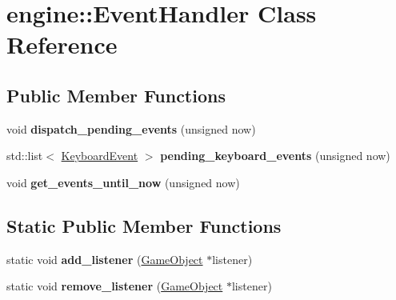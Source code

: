 \hypertarget{classengine_1_1_event_handler}{}\section{engine\+:\+:Event\+Handler Class Reference}
\label{classengine_1_1_event_handler}
\subsection*{Public Member Functions}
\begin{DoxyCompactItemize}
\item 
void {\bfseries dispatch\+\_\+pending\+\_\+events} (unsigned now)\hypertarget{classengine_1_1_event_handler_a7897cdaa9aa300a3d73790ab9245ff62}{}\label{classengine_1_1_event_handler_a7897cdaa9aa300a3d73790ab9245ff62}

\item 
std\+::list$<$ \hyperlink{classengine_1_1_keyboard_event}{Keyboard\+Event} $>$ {\bfseries pending\+\_\+keyboard\+\_\+events} (unsigned now)\hypertarget{classengine_1_1_event_handler_a615ce0d67badc44977c3f71ecb911243}{}\label{classengine_1_1_event_handler_a615ce0d67badc44977c3f71ecb911243}

\item 
void {\bfseries get\+\_\+events\+\_\+until\+\_\+now} (unsigned now)\hypertarget{classengine_1_1_event_handler_a6fc13e4f43fe29d3aafa1ed29018b6d2}{}\label{classengine_1_1_event_handler_a6fc13e4f43fe29d3aafa1ed29018b6d2}

\end{DoxyCompactItemize}
\subsection*{Static Public Member Functions}
\begin{DoxyCompactItemize}
\item 
static void {\bfseries add\+\_\+listener} (\hyperlink{classengine_1_1_game_object}{Game\+Object} $\ast$listener)\hypertarget{classengine_1_1_event_handler_abd94800bc506be842842ceb02078c5bd}{}\label{classengine_1_1_event_handler_abd94800bc506be842842ceb02078c5bd}

\item 
static void {\bfseries remove\+\_\+listener} (\hyperlink{classengine_1_1_game_object}{Game\+Object} $\ast$listener)\hypertarget{classengine_1_1_event_handler_ab52cff70241d86a0c7d7f0b981ef5276}{}\label{classengine_1_1_event_handler_ab52cff70241d86a0c7d7f0b981ef5276}

\end{DoxyCompactItemize}
